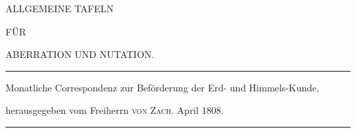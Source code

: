 \clearpage{}%
\thispagestyle{empty}
\begin{center}
\vspace*{1.4in}
{\Large ALLGEMEINE TAFELN\par}
\vspace{.5in}
{\large FÜR\par}
\vspace{.5in}
{\Large ABERRATION UND NUTATION.\par}
\vfill
\hrule\medskip
{\small Monatliche Correspondenz zur Beförderung der Erd- und Himmels-Kunde,\par
herausgegeben vom Freiherrn \textsc{von Zach}. April 1808.\par}
\medskip\hrule
\end{center}
\clearpage
{}%
